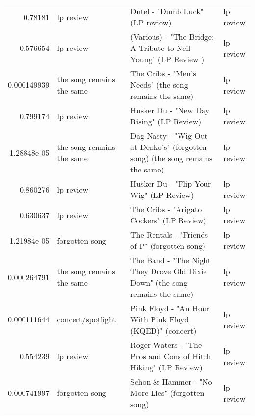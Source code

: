 \documentclass[letterpaper,10pt]{article}
\begin{document}
\begin{table}[H]
\begin{adjustbox}{max width=\linewidth}
\begin{tabular}{rlll}
  0.78181     & lp review                 & Dntel - "Dumb Luck" (LP review)                                                                              & lp review                 \\
  0.576654    & lp review                 & (Various) - "The Bridge: A Tribute to Neil Young" (LP Review  )                                              & lp review                 \\
  0.000149939 & the song remains the same & The Cribs - "Men's Needs"  (the song remains the same)                                                       & lp review                 \\
  0.799174    & lp review                 & Husker Du - "New Day Rising" (LP Review)                                                                     & lp review                 \\
  1.28848e-05 & the song remains the same & Dag Nasty - "Wig Out at Denko's" (forgotten song) (the song remains the same)                                & lp review                 \\
  0.860276    & lp review                 & Husker Du - "Flip Your Wig" (LP Review)                                                                      & lp review                 \\
  0.630637    & lp review                 & The Cribs - "Arigato Cockers" (LP Review)                                                                    & lp review                 \\
  1.21984e-05 & forgotten song            & The Rentals - "Friends of P" (forgotten song)                                                                & lp review                 \\
  0.000264791 & the song remains the same & The Band - "The Night They Drove Old Dixie Down" (the song remains the same)                                 & lp review                 \\
  0.000111644 & concert/spotlight         & Pink Floyd - "An Hour With Pink Floyd (KQED)" (concert)                                                      & lp review                 \\
  0.554239    & lp review                 & Roger Waters - "The Pros and Cons of Hitch Hiking" (LP Review)                                               & lp review                 \\
  0.000741997 & forgotten song            & Schon \& Hammer - "No More Lies" (forgotten song)                                                             & lp review                 \\

\end{tabular}
\end{adjustbox}
\end{table}
\end{document}
